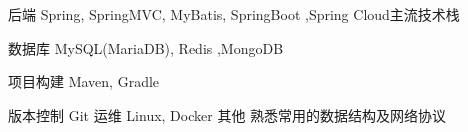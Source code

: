 

\begin{cvskills}

  \cvskill
    {后端} %
    {Spring, SpringMVC, MyBatis, SpringBoot ,Spring Cloud主流技术栈} %

  \cvskill
    {数据库} %
	{MySQL(MariaDB), Redis ,MongoDB} %

  \cvskill
    {项目构建} %
    {Maven, Gradle} %

  \cvskill
    {版本控制} %
    {Git} %
   \cvskill
    {运维} %
    {Linux, Docker } %
    \cvskill
    {其他} %
    {熟悉常用的数据结构及网络协议 } %
	

\end{cvskills}
